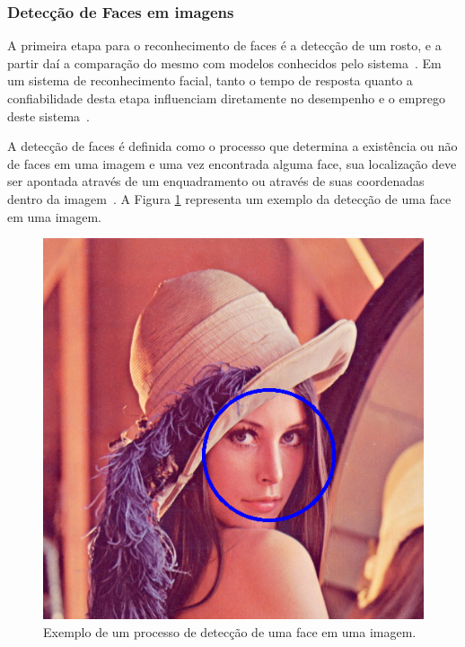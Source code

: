 
\subsubsection{Detecção de Faces em imagens}
	
A primeira etapa para o reconhecimento de faces é a detecção de um rosto, e a partir daí a comparação do mesmo com modelos conhecidos pelo sistema~\cite{hong, oliveira}. Em um sistema de reconhecimento facial, tanto o tempo de resposta quanto a confiabilidade desta etapa influenciam diretamente no desempenho e o emprego deste sistema~\cite{oliveira}.

A detecção de faces é definida como o processo que determina a existência ou não de faces em uma imagem e uma vez encontrada alguma face, sua localização deve ser apontada através de um enquadramento ou através de suas coordenadas dentro da imagem~\cite{oliveira}. A Figura \ref{enquadramentoRosto} representa um exemplo da detecção de uma face em uma imagem.

	\begin{figure}[H]
		\begin{center}
			\includegraphics[scale=0.3]{figuras/2.FundamentacaoTeorica/enquadramentoRosto.png}
		\end{center}
		\caption{Exemplo de um processo de detecção de uma face em uma imagem.}
		\label{enquadramentoRosto}
	\end{figure}

